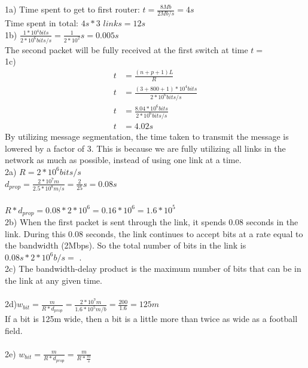 \documentclass[12pt]{report}
\begin{document}
1a) Time spent to get to first router: $t = \frac{8Mb}{2Mb/s} =\boxed{4s}$\\	
Time spent in total: $4s * 3$ $links = \boxed{12s}$\\

1b) $\frac{1*10^4 bits}{2*10^6 bits/s} = \frac{1}{2*10^2} s = \boxed{0.005s}$\\
The second packet will be fully received at the first switch at time $t=$\\

1c) 
\begin{align*}
t &= \frac{(n+p+1)L}{R}\\
t &= \frac{(3+800+1) * 10^4 bits}{2*10^6 bits/s}\\
t &= \frac{8.04*10^6 bits}{2 * 10^6 bits/s}\\
t &= \boxed{4.02s}
\end{align*}
By utilizing message segmentation, the time taken to transmit the message is lowered by a factor of 3. This is because we are fully utilizing all links in the network as much as possible, instead of using one link at a time.\\

2a) $R = 2 * 10^6 bits/s$\\
$d_{prop} = \frac{2*10^7m}{2.5 * 10^8 m/s} = \frac{2}{25}s = \boxed{0.08s}$\\
\\
$R * d_{prop} = 0.08 * 2 * 10^6 = 0.16 * 10^6 = \boxed{1.6 * 10^5}$\\

2b) When the first packet is sent through the link, it spends 0.08 seconds in the link. During this 0.08 seconds, the link continues to accept bits at a rate equal to the bandwidth (2Mbps). So the total number of bits in the link is $0.08s * 2*10^6b/s =$ .\\

2c) The bandwidth-delay product is the maximum number of bits that can be in the link at any given time.\\
\\
2d)$w_{bit} = \frac{m}{R * d_{prop}} = \frac{2 * 10^7m}{1.6*10^5m/b} = \frac{200}{1.6} = \boxed{125m}$\\
If a bit is 125m wide, then a bit is a little more than twice as wide as a football field.\\
\\
2e) $w_{bit} = \frac{m}{R*d_{prop}} = \boxed{\frac{m}{R * \frac{m}{s}}}$\\
\end{document}
